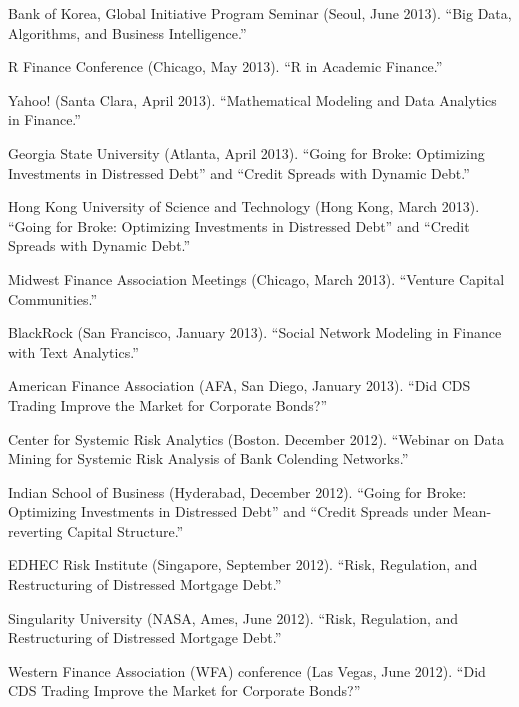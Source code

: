 \documentclass{article}
\begin{document}
\begin{etaremune}
{\item Bank of Korea, Global Initiative Program Seminar (Seoul, June 2013). ``Big Data, Algorithms, and Business Intelligence.''

\item R Finance Conference (Chicago, May 2013). ``R in Academic Finance.''

\item Yahoo! (Santa Clara, April 2013). ``Mathematical Modeling and Data Analytics in Finance.''

\item Georgia State University (Atlanta, April 2013). ``Going for Broke: Optimizing Investments in Distressed Debt'' and ``Credit Spreads with Dynamic Debt.''

\item Hong Kong University of Science and Technology (Hong Kong, March 2013). ``Going for Broke: Optimizing Investments in Distressed Debt'' and ``Credit Spreads with Dynamic Debt.''


\item Midwest Finance Association Meetings (Chicago, March 2013). ``Venture Capital Communities.''

\item BlackRock (San Francisco, January 2013). ``Social Network Modeling in Finance with Text Analytics.''

\item American Finance Association (AFA, San Diego, January 2013). ``Did CDS Trading Improve the Market for Corporate Bonds?''

\item Center for Systemic Risk Analytics (Boston. December 2012). ``Webinar on Data Mining for Systemic Risk Analysis of Bank Colending Networks.''

\item Indian School of Business (Hyderabad, December 2012). 
``Going for Broke: Optimizing Investments in Distressed Debt'' and ``Credit Spreads under Mean-reverting Capital Structure.''

\item EDHEC Risk Institute (Singapore, September 2012). ``Risk, Regulation, and Restructuring of Distressed Mortgage Debt.'' 

\item Singularity University (NASA, Ames, June 2012). ``Risk, Regulation, and Restructuring of Distressed Mortgage Debt.'' 

\item Western Finance Association (WFA) conference (Las Vegas, June 2012). ``Did CDS Trading Improve the Market for Corporate Bonds?''

}
\end{etaremune}
\end{document}
